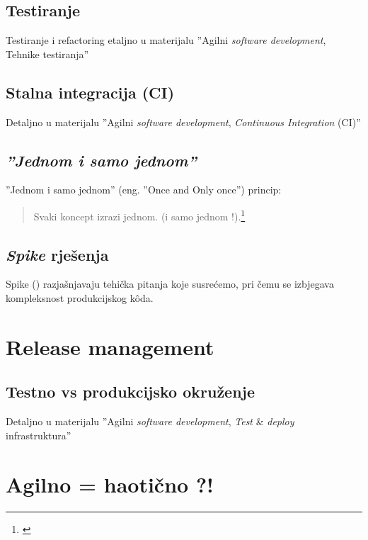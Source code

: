 \documentclass[lmodern, utf8, zavrsni]{fit}
\begin{document}
\section{Testiranje}

Testiranje i refactoring etaljno u materijalu ''Agilni \emph{software development}, Tehnike testiranja''\citep{agiletest}

\section{Stalna integracija (CI)}

Detaljno u materijalu ''Agilni \emph{software development}, \emph{Continuous Integration} (CI)''\citep{agileci}

\section{\emph{''Jednom i samo jednom''}}

''Jednom i samo jednom'' (eng. ''Once and Only once'') princip:

\begin{quotation}
  Svaki koncept izrazi jednom. (i samo jednom !).\footnote{\citep[str. 319]{agileart}}
\end{quotation}


\section{\emph{Spike} rješenja}

Spike (\href{http://translate.google.com/#en/hr/spike}{\color{blue}{bos. ekser, smeč}}) razjašnjavaju tehička pitanja koje susrećemo, pri čemu se izbjegava kompleksnost produkcijskog k\^oda.\citep[str. 334]{agileart}


\chapter{Release management}

\section{Testno vs produkcijsko okruženje}

Detaljno u materijalu ''Agilni \emph{software development}, \emph{Test} \& \emph{deploy} infrastruktura''\citep{agiletestdeploy}

\chapter{Agilno = haotično ?!}
\end{document}

